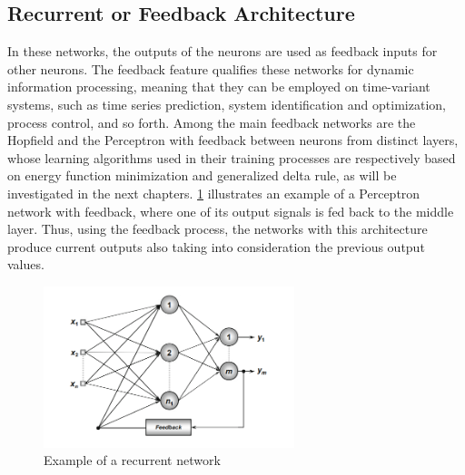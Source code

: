 \subsection{Recurrent or Feedback Architecture}
In these networks, the outputs of the neurons are used as feedback inputs for other
neurons. The feedback feature qualifies these networks for dynamic information
processing, meaning that they can be employed on time-variant systems, such as
time series prediction, system identification and optimization, process control, and
so forth.
Among the main feedback networks are the Hopfield and the Perceptron with
feedback between neurons from distinct layers, whose learning algorithms used in
their training processes are respectively based on energy function minimization and
generalized delta rule, as will be investigated in the next chapters.
\ref{fig:ann3} illustrates an example of a Perceptron network with feedback, where
one of its output signals is fed back to the middle layer.
Thus, using the feedback process, the networks with this architecture produce
current outputs also taking into consideration the previous output values.
\begin{figure}[H]
\centering
\includegraphics[width=0.65\textwidth]{ann3.PNG}
\caption{ Example of a recurrent network }
\label{fig:ann3}
\end{figure}

